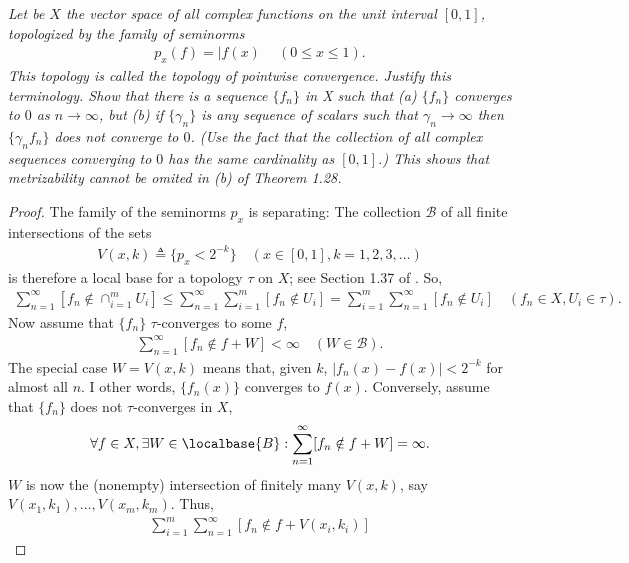 \textit{
Let be $X$ the vector space of all complex functions on the unit interval %
$[0, 1]$, topologized by the family of seminorms %
%
\begin{align}
  p_x(f)= |f(x)\ \quad (0\leq x\leq 1).\nonumber
\end{align}
%
This topology is called the topology of pointwise convergence. %
Justify this terminology. %
%
Show that there is a sequence $\{f_n\}$ in X such that (a) %
%
  $\{f_n\}$ converges to $0$ as $n \to\infty$, %
%
but (b) if $\{\gamma_n\}$ is any sequence of scalars such that %
%
  $\gamma_n\to\infty$ %
%
then $\{\gamma_n f_n\}$ does not converge to $0$. %
(Use the fact that the collection of all complex sequences converging to $0$ %
has the same cardinality as $[0, 1]$.) %
%
This shows that metrizability cannot be omited in (b) of Theorem 1.28.
}
%
\begin{proof}
The family of the seminorms $p_x$ is separating: %
The collection $\mathscr{B}$ of all finite intersections of the sets %
%
\begin{align}
  V(x,k) \triangleq \{p_x < 2^{\minus k}\} 
  \quad (x \in [0, 1], k=1, 2, 3, \dots)
\end{align}
%
is therefore a local base for a topology $\tau$ on $X$; %
see Section 1.37 of \cite{FA}. %
So, 
%
\begin{align}
  \label{Inequality boolean series}
  \sum_{n=1}^\infty [f_n \notin \cap_{i=1}^m U_i] \leq 
  \sum_{n=1}^\infty \sum_{i=1}^m      [f_n \notin U_i] = 
  \sum_{i=1}^m      \sum_{n=1}^\infty [f_n \notin U_i]
  \quad (f_n \in X, U_i \in \tau).
\end{align}
%
Now assume that $\{f_n\}$ $\tau$-converges to some $f$, \ie 
%
\begin{align}
  \sum_{n=1}^\infty [f_n \notin f + W] < \infty \quad (W \in \mathscr{B}).
\end{align}
The special case %
%
$W = V(x, k)$ %
%
means that, given $k$, %
%
$|f_n(x) - f(x)| < 2^{\minus k}$ %
%
for almost all $n$. %
I other words, $\{f_n(x)\}$ converges to $f(x)$. %
%
Conversely, assume that $\{f_n\}$ does not $\tau$-converges in $X$, \ie %
%
\begin{align}
  \label{Divergence}
  \forall f \in X, \exists W \in \localbase{B}: 
    \sum_{n=1}^\infty [f_n \notin f +  W] = \infty. 
\end{align}
%
$W$ is now the (nonempty) intersection of finitely many $V(x, k)$, say %
%
  $V(x_1, k_1), \dots, V(x_m, k_m)$. %
%
Thus,  %
%
\begin{align}
  \sum_{i=1}^m \sum_{n=1}^\infty [f_n \notin f + V(x_i, k_i)]

\end{align}
\end{proof}
